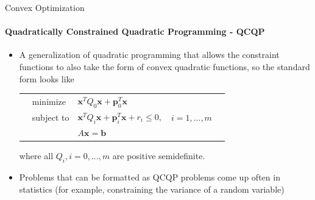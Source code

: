 \documentclass{beamer}
\renewcommand{\vec}{\mathbf}
\begin{document}
%
%	
	\begin{frame}{Convex Optimization}
		\framesubtitle{Quadratically Constrained Quadratic Programming - QCQP}
		\begin{itemize}
			\item A generalization of quadratic programming that allows the constraint functions to also take the form of convex quadratic functions, so the standard form looks like
			\begin{tabularx}{\textwidth}{X l l l X}
				& minimize		& $\vec{x}^TQ_0\vec{x} + \vec{p}_0^T\vec{x}$	& &\\
				& subject to	& $\vec{x}^TQ_i\vec{x} + \vec{p}_i^T\vec{x} + r_i \leq 0,$	& $i=1,...,m$ &\\
				&				& $A\vec{x} = \vec{b}$ & &
			\end{tabularx}
			where all $Q_i, i=0,...,m$ are positive semidefinite.
			\item Problems that can be formatted as QCQP problems come up often in statistics (for example, constraining the variance of a random variable)
		\end{itemize}
	\end{frame}
%
\end{document}
